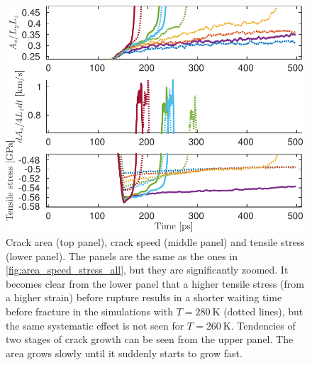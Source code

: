 \begin{figure}
\centering
\includegraphics[width=12cm]{../figures/thesis/area_speed_stress_all_zoomed.pdf}
\caption{Crack area (top panel), crack speed (middle panel) and tensile stress (lower panel). The panels are the same as the ones in \ref{fig:area_speed_stress_all}, but they are significantly zoomed. It becomes clear from the lower panel that a higher tensile stress (from a higher strain) before rupture results in a shorter waiting time before fracture in the simulations with $T=\SI{280}{\kelvin}$ (dotted lines), but the same systematic effect is not seen for $T=\SI{260}{\kelvin}$. Tendencies of two stages of crack growth can be seen from the upper panel. The area grows slowly until it suddenly starts to grow fast.}
\label{fig:area_speed_stress_zoom}
\end{figure}

